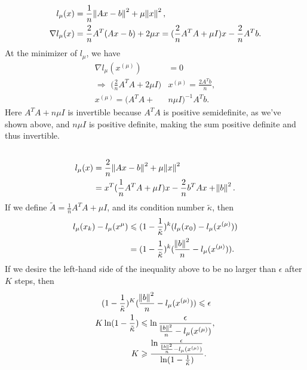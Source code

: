 \documentclass[11pt]{article}
\begin{document}
\subsection{}
\begin{equation}\begin{split} 
l_{\mu}(x) &= \frac1n\norm{Ax-b}^2+\mu\norm{x}^2,\\
\nabla l_{\mu}(x) &= \frac2n A^T(Ax-b) + 2\mu x = (\frac2n A^TA + \mu I)x - \frac2n A^Tb.
\end{split}\nonumber\end{equation}	
At the minimizer of $l_{\mu}$, we have 
\begin{equation}\begin{split}
\nabla l_{\mu}(x^{(\mu)}) &= 0 \\
\Rightarrow\,\,\big( \frac2n A^TA  +2\mu I \big)&x^{(\mu)} = \frac{2A^Tb}n,\\
x^{(\mu)} = \big(A^TA+&n\mu I  \big)^{-1}A^Tb.
\end{split}\nonumber\end{equation} 
Here $A^TA+n\mu I$ is invertible because $A^TA$ is positive semidefinite, as we've shown above, and $n\mu I$ is positive definite, making the sum positive definite and thus invertible.

\subsection{}
\begin{equation}\begin{split} 
l_{\mu}(x) & = \frac2n\norm{Ax-b}^2+\mu\norm{x}^2\\
&=x^T(\frac1n A^TA + \mu I)x-\frac2n b^TAx+\norm{b}^2.
\end{split}\nonumber\end{equation} 
If we define $\tilde A = \frac1nA^TA+\mu I$, and its condition number $\tilde \kappa$, then
\begin{equation}\begin{split} 
l_{\mu}(x_k) - l_{\mu}(x^{\mu}) &\leqslant (1-\frac1{\tilde \kappa})^k(l_{\mu}(x_0)-l_{\mu}(x^{(\mu)}))\\
&=(1-\frac1{\tilde \kappa})^k(\frac{\norm{b}^2}n-l_{\mu}(x^{(\mu)})).
\end{split}\nonumber\end{equation} 
If we desire the left-hand side of the inequality above to be no larger than $\epsilon$ after $K$ steps, then 
\begin{equation}\begin{split} 
(1-\frac1{\tilde\kappa})^K(&\frac{\norm{b}^2}n-l_{\mu}(x^{(\mu)}))\leqslant \epsilon\\
K\ln(1-\frac1{\tilde\kappa})&\leqslant \ln\frac{\epsilon}{\frac{\norm{b}^2}n-l_{\mu}(x^{(\mu)})},\\
K&\geqslant\frac{\ln\frac{\epsilon}{\frac{\norm{b}^2}n-l_{\mu}(x^{(\mu)})}}{\ln(1-\frac1{\tilde\kappa})}.
\end{split}\nonumber\end{equation} 
\end{document}
